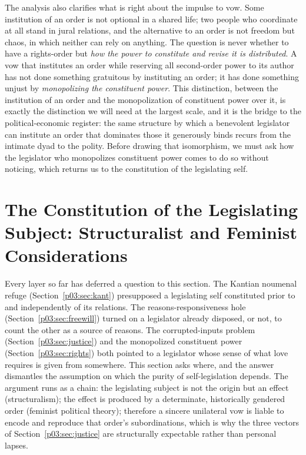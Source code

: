 \documentclass[11pt,a4paper]{article}
\begin{document}
The analysis also clarifies what is right about the impulse to vow. Some institution of an order is not optional in a shared life; two people who coordinate at all stand in jural relations, and the alternative to an order is not freedom but chaos, in which neither can rely on anything. The question is never whether to have a rights-order but \emph{how the power to constitute and revise it is distributed}. A vow that institutes an order while reserving all second-order power to its author has not done something gratuitous by instituting an order; it has done something unjust by \emph{monopolizing the constituent power}. This distinction, between the institution of an order and the monopolization of constituent power over it, is exactly the distinction we will need at the largest scale, and it is the bridge to the political-economic register: the same structure by which a benevolent legislator can institute an order that dominates those it generously binds recurs from the intimate dyad to the polity. Before drawing that isomorphism, we must ask how the legislator who monopolizes constituent power comes to do so without noticing, which returns us to the constitution of the legislating self.

\section{The Constitution of the Legislating Subject: Structuralist and Feminist Considerations}\label{p03:sec:subject}

Every layer so far has deferred a question to this section. The Kantian noumenal refuge (Section~\ref{p03:sec:kant}) presupposed a legislating self constituted prior to and independently of its relations. The reasons-responsiveness hole (Section~\ref{p03:sec:freewill}) turned on a legislator already disposed, or not, to count the other as a source of reasons. The corrupted-inputs problem (Section~\ref{p03:sec:justice}) and the monopolized constituent power (Section~\ref{p03:sec:rights}) both pointed to a legislator whose sense of what love requires is given from somewhere. This section asks where, and the answer dismantles the assumption on which the purity of self-legislation depends. The argument runs as a chain: the legislating subject is not the origin but an effect (structuralism); the effect is produced by a determinate, historically gendered order (feminist political theory); therefore a sincere unilateral vow is liable to encode and reproduce that order's subordinations, which is why the three vectors of Section~\ref{p03:sec:justice} are structurally expectable rather than personal lapses.
\end{document}
